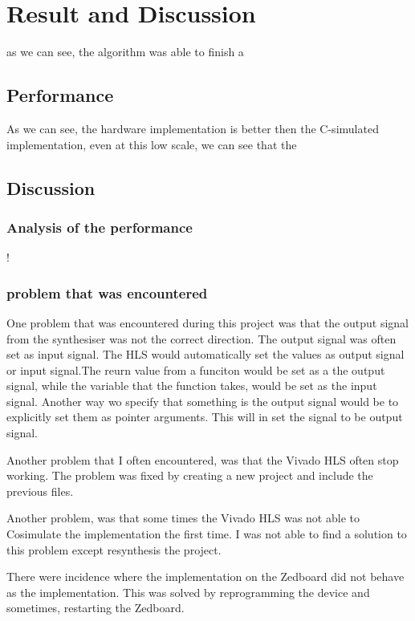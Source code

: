 \chapter{Result and Discussion} \label{result}

as we can see, the algorithm was able to finish a 



\section{Performance}
As we can see, the hardware implementation is better then the C-simulated implementation, even at this low scale, we can see that the


\section{Discussion}
\subsection*{Analysis of the performance}
! 
\subsection*{problem that was encountered}
One problem that was encountered during this project was that the output signal from the synthesiser was not the correct direction. The output signal was often set as input signal. The HLS would automatically set the values as output signal or input signal.The reurn value from a funciton would be set as a the output signal, while the variable that the function takes, would be set as the input signal. Another way wo specify that something is the output signal would be to explicitly set them as pointer arguments. This will in set the signal to be output signal.

Another problem that I often encountered, was that the Vivado HLS often stop working. The problem was fixed by creating a new project and include the previous files.

Another problem, was that some times the Vivado HLS was not able to Cosimulate the implementation the first time. I was not able to find a solution to this problem except resynthesis the project. 

There were incidence where the implementation on the Zedboard did not behave as the implementation. This was solved by reprogramming the device and sometimes, restarting the Zedboard.


